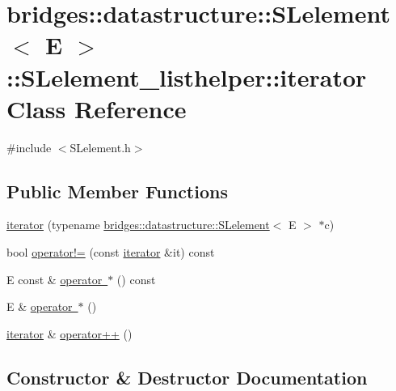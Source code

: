 \hypertarget{classbridges_1_1datastructure_1_1_s_lelement_1_1_s_lelement__listhelper_1_1iterator}{}\section{bridges\+::datastructure\+::S\+Lelement$<$ E $>$\+::S\+Lelement\+\_\+listhelper\+::iterator Class Reference}
\label{classbridges_1_1datastructure_1_1_s_lelement_1_1_s_lelement__listhelper_1_1iterator}


{\ttfamily \#include $<$S\+Lelement.\+h$>$}

\subsection*{Public Member Functions}
\begin{DoxyCompactItemize}
\item 
\mbox{\hyperlink{classbridges_1_1datastructure_1_1_s_lelement_1_1_s_lelement__listhelper_1_1iterator_a1144192d651fcb5b12eb8cb33dc8d554}{iterator}} (typename \mbox{\hyperlink{classbridges_1_1datastructure_1_1_s_lelement}{bridges\+::datastructure\+::\+S\+Lelement}}$<$ E $>$ $\ast$c)
\item 
bool \mbox{\hyperlink{classbridges_1_1datastructure_1_1_s_lelement_1_1_s_lelement__listhelper_1_1iterator_a2bfd8ffd134a55488f27d1263d3c95a4}{operator!=}} (const \mbox{\hyperlink{classbridges_1_1datastructure_1_1_s_lelement_1_1_s_lelement__listhelper_1_1iterator}{iterator}} \&it) const
\item 
E const  \& \mbox{\hyperlink{classbridges_1_1datastructure_1_1_s_lelement_1_1_s_lelement__listhelper_1_1iterator_a347922a24a43129b43c8d18b5a2cc9ac}{operator $\ast$}} () const
\item 
E \& \mbox{\hyperlink{classbridges_1_1datastructure_1_1_s_lelement_1_1_s_lelement__listhelper_1_1iterator_a270b4ca1d8b53049788d928056c137b0}{operator $\ast$}} ()
\item 
\mbox{\hyperlink{classbridges_1_1datastructure_1_1_s_lelement_1_1_s_lelement__listhelper_1_1iterator}{iterator}} \& \mbox{\hyperlink{classbridges_1_1datastructure_1_1_s_lelement_1_1_s_lelement__listhelper_1_1iterator_ab5847041e6e49fa6bcfd5efe6d2a1e1a}{operator++}} ()
\end{DoxyCompactItemize}


\subsection{Constructor \& Destructor Documentation}
\mbox{\label{classbridges_1_1datastructure_1_1_s_lelement_1_1_s_lelement__listhelper_1_1iterator_a1144192d651fcb5b12eb8cb33dc8d554}} 
